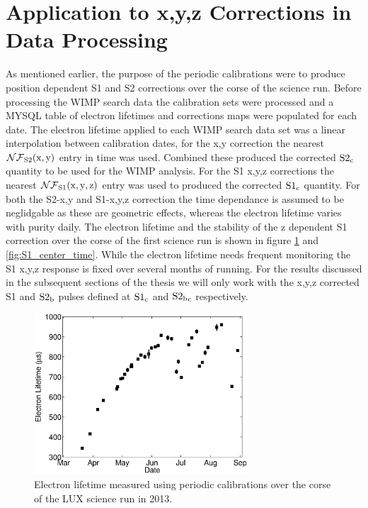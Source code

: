 \section{Application to x,y,z Corrections in Data Processing}

As mentioned earlier, the purpose of the periodic \KrCal calibrations were to produce position dependent S1 and S2 corrections over the corse of the science run. Before processing the WIMP search data the calibration sets were processed and a MYSQL table of electron lifetimes and corrections maps were populated for each date. The electron lifetime applied to each WIMP search data set was a linear interpolation between calibration dates, for the x,y correction the nearest $\rm \mathcal{NF}_{S2}(x,y)$ entry in time was used. Combined these produced the corrected $\rm S2_c$ quantity to be used for the WIMP analysis. For the S1 x,y,z corrections the nearest $\rm \mathcal{NF}_{S1}(x,y,z)$ entry was used to produced the corrected $\rm S1_c$ quantity. For both the S2-x,y and S1-x,y,z correction the time dependance is assumed to be neglidgable as these are geometric effects, whereas the electron lifetime varies with purity daily.
The electron lifetime and the stability of the z dependent S1 correction over the corse of the first science run is shown in figure \ref{fig:S2_EL_time} and \ref{fig:S1_center_time}. While the electron lifetime needs frequent monitoring the S1 x,y,z response is fixed over several months of running.
For the results discussed in the subsequent sections of the thesis we will only work with the x,y,z corrected S1 and $\rm S2_b$ pulses defined at $\rm S1_c$ and $\rm S2{_b}_c$ respectively.

\begin{figure}[h!]\centering
\includegraphics[width=80mm]{Chapter_XYZ_Corr/Thesis_Corr_Plots/lifetime_fig_2.eps}
\caption{Electron lifetime measured using periodic \KrCal calibrations over the corse of the LUX science run in 2013.}
\label{fig:S2_EL_time}
\end{figure}

